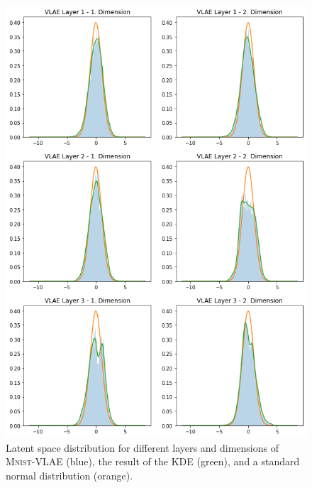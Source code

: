 \begin{figure}[H]
    \centering
    \includegraphics[width=\textwidth]{images/generated_vs_true/mnist/vlae_kde.png}
    \caption[\textsc{Mnist}-VLAE - Estimated Latent Space Distribution]{Latent space distribution for different layers and dimensions of \textsc{Mnist}-\ac{VLAE} (blue), the result of the \ac{KDE} (green), and a standard normal distribution (orange).}
\end{figure}

